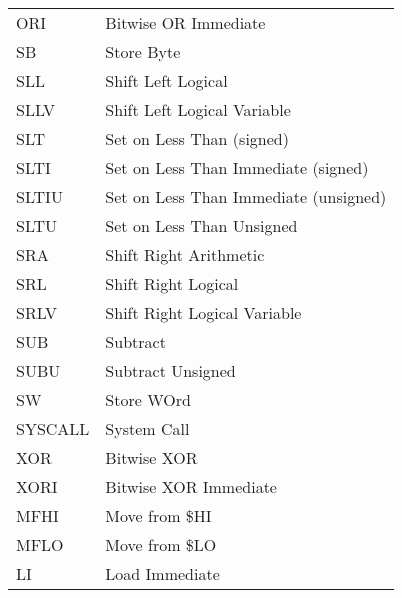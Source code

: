 \documentclass[11pt]{article}
\begin{document}
\begin{longtable}{l|l}
ORI & Bitwise OR Immediate\\
SB & Store Byte\\
SLL & Shift Left Logical\\
SLLV & Shift Left Logical Variable\\
SLT & Set on Less Than (signed)\\
SLTI & Set on Less Than Immediate (signed)\\
SLTIU & Set on Less Than Immediate (unsigned)\\
SLTU & Set on Less Than Unsigned\\
SRA & Shift Right Arithmetic\\
SRL & Shift Right Logical\\
SRLV & Shift Right Logical Variable\\
SUB & Subtract\\
SUBU & Subtract Unsigned\\
SW & Store WOrd\\
SYSCALL & System Call\\
XOR & Bitwise XOR\\
XORI & Bitwise XOR Immediate\\
MFHI & Move from \$HI\\
MFLO & Move from \$LO\\
LI & Load Immediate\\
\end{longtable}
\end{document}
